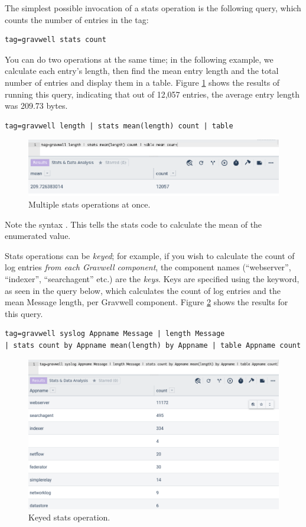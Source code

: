 The simplest possible invocation of a stats operation is the following query, which counts the number of entries in the  tag:

\begin{verbatim}
tag=gravwell stats count
\end{verbatim}

You can do two operations at the same time; in the following example, we calculate each entry's length, then find the mean entry length and the total number of entries and display them in a table. Figure \ref{fig:stats-mean-count} shows the results of running this query, indicating that out of 12,057 entries, the average entry length was 209.73 bytes.

\begin{verbatim}
tag=gravwell length | stats mean(length) count | table
\end{verbatim}

\begin{figure}
	\includegraphics[width=0.8\linewidth]{images/stats-mean-count.png}
	\caption{Multiple stats operations at once.}
	\label{fig:stats-mean-count}
\end{figure}

Note the syntax . This tells the stats code to calculate the mean of the  enumerated value.

Stats operations can be \emph{keyed}; for example, if you wish to calculate the count of log entries \emph{from each Gravwell component}, the component names (``webserver'', ``indexer'', ``searchagent'' etc.) are the \emph{keys}. Keys are specified using the  keyword, as seen in the query below, which calculates the count of log entries and the mean Message length, per Gravwell component. Figure \ref{fig:stats-keyed} shows the results for this query.

\begin{verbatim}
tag=gravwell syslog Appname Message | length Message 
| stats count by Appname mean(length) by Appname | table Appname count
\end{verbatim}

\begin{figure}
	\includegraphics[width=0.8\linewidth]{images/stats-keyed.png}
	\caption{Keyed stats operation.}
	\label{fig:stats-keyed}
\end{figure}

